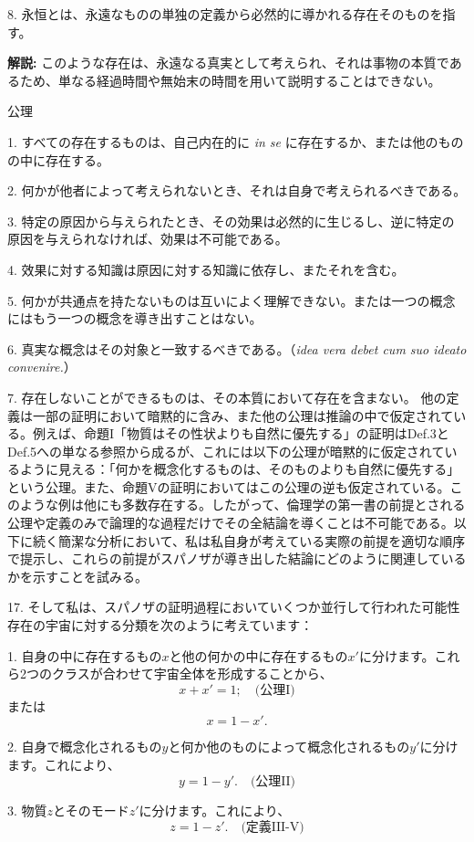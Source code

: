 \documentclass[a4paper,11pt,openany]{ltjsbook}
\begin{document}
8. 永恒とは、永遠なものの単独の定義から必然的に導かれる存在そのものを指す。

\textbf{解説:} このような存在は、永遠なる真実として考えられ、それは事物の本質であるため、単なる経過時間や無始末の時間を用いて説明することはできない。

\centerline{公理}

1. すべての存在するものは、自己内在的に \emph{in se} に存在するか、または他のものの中に存在する。

2. 何かが他者によって考えられないとき、それは自身で考えられるべきである。

3. 特定の原因から与えられたとき、その効果は必然的に生じるし、逆に特定の原因を与えられなければ、効果は不可能である。

4. 效果に対する知識は原因に対する知識に依存し、またそれを含む。

5. 何かが共通点を持たないものは互いによく理解できない。または一つの概念にはもう一つの概念を導き出すことはない。

6. 真実な概念はその対象と一致するべきである。（\emph{idea vera debet cum suo ideato convenire.}）

7. 存在しないことができるものは、その本質において存在を含まない。
他の定義は一部の証明において暗黙的に含み、また他の公理は推論の中で仮定されている。例えば、命題I「物質はその性状よりも自然に優先する」の証明はDef.3とDef.5への単なる参照から成るが、これには以下の公理が暗黙的に仮定されているように見える：「何かを概念化するものは、そのものよりも自然に優先する」という公理。また、命題Vの証明においてはこの公理の逆も仮定されている。このような例は他にも多数存在する。したがって、倫理学の第一書の前提とされる公理や定義のみで論理的な過程だけでその全結論を導くことは不可能である。以下に続く簡潔な分析において、私は私自身が考えている実際の前提を適切な順序で提示し、これらの前提がスパノザが導き出した結論にどのように関連しているかを示すことを試みる。

17. そして私は、スパノザの証明過程においていくつか並行して行われた可能性存在の宇宙に対する分類を次のように考えています：

1. 自身の中に存在するもの$x$と他の何かの中に存在するもの$x'$に分けます。これら2つのクラスが合わせて宇宙全体を形成することから、
\[
  x + x' = 1; \quad \text{(公理I)}
\]
または
\[
  x = 1 - x'.
\]

2. 自身で概念化されるもの$y$と何か他のものによって概念化されるもの$y'$に分けます。これにより、
\[
  y = 1 - y'. \quad \text{(公理II)}
\]

3. 物質$z$とそのモード$z'$に分けます。これにより、
\[
  z = 1 - z'. \quad \text{(定義III-V)}
\]
\end{document}
